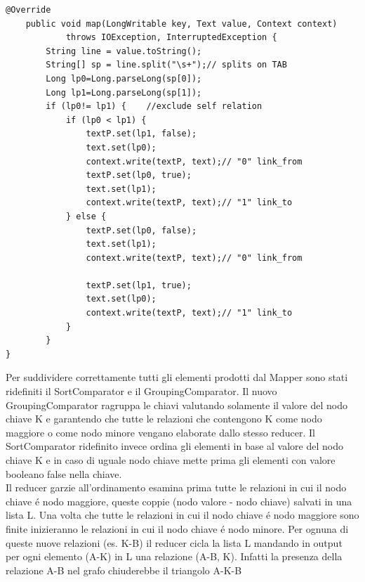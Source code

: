 \documentclass[paper=a4, fontsize=11pt]{scrartcl}	%
\numberwithin{equation}{section}															%
\numberwithin{figure}{section}																%
\numberwithin{table}{section}																%
\begin{document}
\begin{lstlisting}[label=Mapper1,caption=Implementazione del Mapper1]
@Override
	public void map(LongWritable key, Text value, Context context)
			throws IOException, InterruptedException {
		String line = value.toString();
		String[] sp = line.split("\s+");// splits on TAB
		Long lp0=Long.parseLong(sp[0]);
		Long lp1=Long.parseLong(sp[1]);
		if (lp0!= lp1) { 	//exclude self relation
			if (lp0 < lp1) {
				textP.set(lp1, false);
				text.set(lp0);
				context.write(textP, text);// "0" link_from
				textP.set(lp0, true);
				text.set(lp1);
				context.write(textP, text);// "1" link_to
			} else {
				textP.set(lp0, false);
				text.set(lp1);
				context.write(textP, text);// "0" link_from

				textP.set(lp1, true);
				text.set(lp0);
				context.write(textP, text);// "1" link_to
			}
		}
}\end{lstlisting}
Per suddividere correttamente tutti gli elementi prodotti dal Mapper sono stati ridefiniti il SortComparator e il GroupingComparator.
Il nuovo GroupingComparator ragruppa le chiavi valutando solamente il valore del nodo chiave K e garantendo che tutte le relazioni che contengono K come nodo maggiore o come nodo minore vengano elaborate dallo stesso reducer. Il SortComparator ridefinito invece ordina gli elementi in base al valore del nodo chiave K e in caso di uguale nodo chiave mette prima gli elementi con valore booleano false nella chiave.\\ Il reducer  garzie all'ordinamento esamina prima tutte le relazioni in cui il nodo chiave \'e nodo maggiore, queste coppie (nodo valore - nodo chiave) salvati in una lista L. Una volta che tutte le relazioni in cui il nodo chiave \'e nodo maggiore sono finite inizieranno le relazioni in cui il nodo chiave \'e nodo minore. Per ognuna di queste nuove relazioni (es. K-B) il reducer cicla la lista L mandando in output per ogni elemento (A-K) in L una relazione (A-B, K). Infatti la presenza della relazione A-B nel grafo chiuderebbe il triangolo A-K-B 
\end{document}
